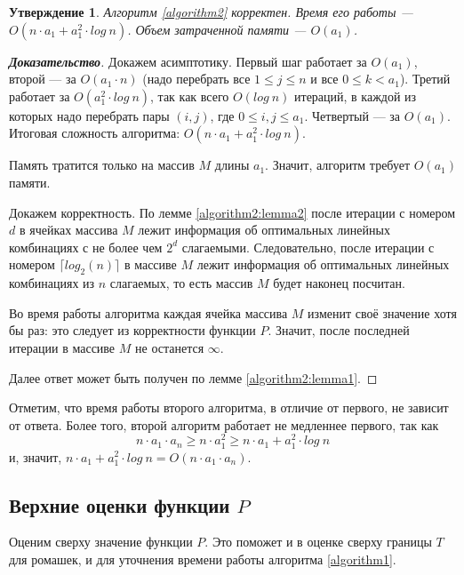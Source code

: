 \documentclass[12pt]{article}
\newtheorem{proposition}[theorem]{Утверждение}
\begin{document}
\begin{proposition}
Алгоритм \ref{algorithm2} корректен. Время его работы --- $O(n \cdot a_1 + a_1^2 \cdot log \ n)$. Объем затраченной памяти --- $O(a_1)$.
\end{proposition}
\begin{proof}[\textbf{Доказательство}]
Докажем асимптотику. Первый шаг работает за $O(a_1)$, второй --- за $O(a_1 \cdot n)$ (надо перебрать все $1 \le j \le n$ и все $0 \le k < a_1$). Третий работает за $O(a_1^2 \cdot log \ n)$, так как всего $O(log \ n)$ итераций, в каждой из которых надо перебрать пары $(i, j)$, где $0 \le i, j \le a_1$. Четвертый --- за $O(a_1)$. Итоговая сложность алгоритма: $O(n \cdot a_1 + a_1^2 \cdot log \ n)$.

Память тратится только на массив $M$ длины $a_1$. Значит, алгоритм требует $O(a_1)$ памяти.

Докажем корректность. По лемме \ref{algorithm2:lemma2} после итерации с номером $d$ в ячейках массива $M$ лежит информация об оптимальных линейных комбинациях с не более чем $2^d$ слагаемыми. Следовательно, после итерации с номером $\lceil log_2(n) \rceil$ в массиве $M$ лежит информация об оптимальных линейных комбинациях из $n$ слагаемых, то есть массив $M$ будет наконец посчитан.

Во время работы алгоритма каждая ячейка массива $M$ изменит своё значение хотя бы раз: это следует из корректности функции $P$. Значит, после последней итерации в массиве $M$ не останется $\infty$.

Далее ответ может быть получен по лемме \ref{algorithm2:lemma1}.
\end{proof}

Отметим, что время работы второго алгоритма, в отличие от первого, не зависит от ответа. Более того, второй алгоритм работает не медленнее первого, так как \begin{equation*}
n \cdot a_1 \cdot a_n \ge n \cdot a_1^2 \ge n \cdot a_1 + a_1^2 \cdot log \ n
\end{equation*}
и, значит, $n \cdot a_1 + a_1^2 \cdot log \ n = O(n \cdot a_1 \cdot a_n)$.

\subsection{Верхние оценки функции $P$}
Оценим сверху значение функции $P$. Это поможет и в оценке сверху границы $T$ для ромашек, и для уточнения времени работы алгоритма \ref{algorithm1}.
\end{document}
